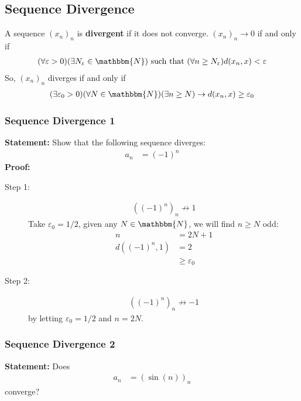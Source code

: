 \documentclass[10pt]{extarticle}
\newcommand{\N}{\mathbbm{N}}
\begin{document}
  \subsection{Sequence Divergence}%
    A sequence $(x_n)_n$ is \textbf{divergent} if it does not converge. $(x_n)_n \rightarrow 0$ if and only if
    \begin{align*}
      (\forall \varepsilon > 0)(\exists N_{\varepsilon} \in \N) \text{ such that } (\forall n\geq N_{\varepsilon}) d(x_n,x) < \varepsilon
    \end{align*}
    So, $(x_n)_n$ diverges if and only if
    \begin{align*}
      (\exists \varepsilon_0 > 0)(\forall N\in\N) (\exists n\geq N) \rightarrow d(x_n,x)\geq \varepsilon_0
    \end{align*}
    \subsubsection{Sequence Divergence 1}%
    \textbf{Statement:} Show that the following sequence diverges:
      \begin{align*}
        a_n &= (-1)^n
      \end{align*}
      \textbf{Proof:}
      \begin{description}
        \item[Step 1:]
          \begin{align*}
            \left((-1)^n\right)_n \not\rightarrow 1
          \end{align*}
          Take $\varepsilon_0 = 1/2$, given any $N\in\N$, we will find $n\geq N$ odd:
          \begin{align*}
            n &= 2N+1\\
            d((-1)^n,1) &= 2\\
                        &\geq \varepsilon_0
          \end{align*}
        \item[Step 2:]
          \begin{align*}
            \left((-1)^n\right)_n \not\rightarrow -1
          \end{align*}
          by letting $\varepsilon_0 = 1/2$ and $n = 2N$.
      \end{description}
      \subsubsection{Sequence Divergence 2}%
      \textbf{Statement:} Does
      \begin{align*}
        a_n &= \left(\sin(n)\right)_n
      \end{align*}
      converge?\\
\end{document}
